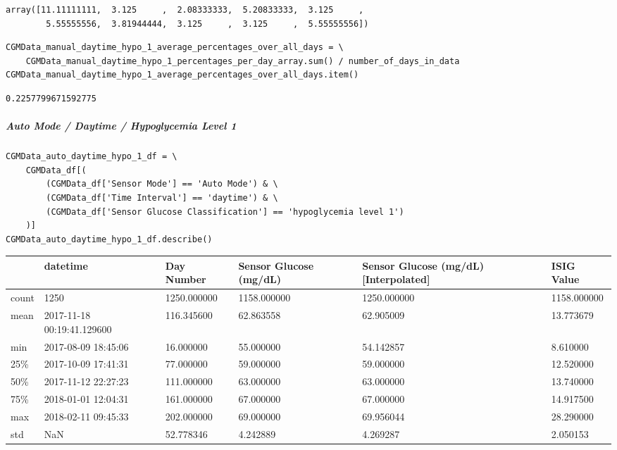 \begin{verbatim}
array([11.11111111,  3.125     ,  2.08333333,  5.20833333,  3.125     ,
        5.55555556,  3.81944444,  3.125     ,  3.125     ,  5.55555556])
\end{verbatim}

\begin{verbatim}
CGMData_manual_daytime_hypo_1_average_percentages_over_all_days = \
    CGMData_manual_daytime_hypo_1_percentages_per_day_array.sum() / number_of_days_in_data
CGMData_manual_daytime_hypo_1_average_percentages_over_all_days.item()
\end{verbatim}

\begin{verbatim}
0.2257799671592775
\end{verbatim}

\subparagraph{Auto Mode / Daytime / Hypoglycemia Level 1}

\begin{verbatim}
CGMData_auto_daytime_hypo_1_df = \
    CGMData_df[(
        (CGMData_df['Sensor Mode'] == 'Auto Mode') & \
        (CGMData_df['Time Interval'] == 'daytime') & \
        (CGMData_df['Sensor Glucose Classification'] == 'hypoglycemia level 1')
    )]
CGMData_auto_daytime_hypo_1_df.describe()
\end{verbatim}

\bigskip\noindent
\begin{tabular}{p{}p{}p{}p{}p{}p{}}
\toprule
 & datetime & Day Number & Sensor Glucose (mg/dL) & Sensor Glucose (mg/dL) [Interpolated] & ISIG Value \\
\hline
count & 1250 & 1250.000000 & 1158.000000 & 1250.000000 & 1158.000000 \\
\hline
mean & 2017-11-18 00:19:41.129600 & 116.345600 & 62.863558 & 62.905009 & 13.773679 \\
\hline
min & 2017-08-09 18:45:06 & 16.000000 & 55.000000 & 54.142857 & 8.610000 \\
\hline
25\% & 2017-10-09 17:41:31 & 77.000000 & 59.000000 & 59.000000 & 12.520000 \\
\hline
50\% & 2017-11-12 22:27:23 & 111.000000 & 63.000000 & 63.000000 & 13.740000 \\
\hline
75\% & 2018-01-01 12:04:31 & 161.000000 & 67.000000 & 67.000000 & 14.917500 \\
\hline
max & 2018-02-11 09:45:33 & 202.000000 & 69.000000 & 69.956044 & 28.290000 \\
\hline
std & NaN & 52.778346 & 4.242889 & 4.269287 & 2.050153 \\
\hline
\bottomrule
\end{tabular}

